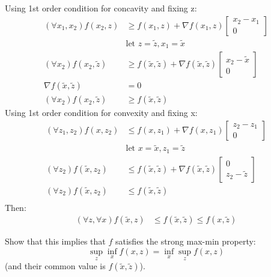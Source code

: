 \documentclass[12pt,letter]{article}
\begin{document}
\begin{enumerate}
\begin{enumerate}
    Using 1st order condition for concavity and fixing z:
    \begin{align*}
      (\forall x_1, x_2) f(x_2,z) & \geq f(x_1,z) + \nabla f(x_1,z)\begin{bmatrix} x_2-x_1\\0\end{bmatrix}\\
                                  &\text{let } z=\tilde{z}, x_1 = \tilde{x}\\
      (\forall x_2) f(x_2,\tilde{z}) & \geq f(\tilde{x},\tilde{z}) + \nabla f(\tilde{x},\tilde{z})\begin{bmatrix} x_2-\tilde{x}\\0\end{bmatrix}\\
      \nabla f(\tilde{x},\tilde{z}) &= 0\\
      (\forall x_2) f(x_2,\tilde{z}) & \geq f(\tilde{x},\tilde{z})
    \end{align*}
    Using 1st order condition for convexity and fixing x:
    \begin{align*}
      (\forall z_1, z_2) f(x,z_2) & \leq f(x,z_1) + \nabla f(x,z_1)\begin{bmatrix} z_2-z_1\\0\end{bmatrix}\\
                                  &\text{let } x=\tilde{x}, z_1 = \tilde{z}\\
      (\forall z_2) f(\tilde{x},z_2) & \leq f(\tilde{x},\tilde{z}) + \nabla f(\tilde{x},\tilde{z})\begin{bmatrix} 0\\z_2-\tilde{z}\end{bmatrix}\\
      (\forall z_2) f(\tilde{x},z_2) & \leq f(\tilde{x},\tilde{z})\\
    \end{align*}
    Then:
    \begin{align*}
      (\forall z, \forall x) f(\tilde{x},z) & \leq f(\tilde{x},\tilde{z}) \leq f(x,\tilde{z})
    \end{align*}
    
    \pagebreak
    
    Show that this implies that $f$ satisfies the strong max-min property: \[\sup_z \inf_x f(x, z) = \inf_x \sup_z f(x, z)\] (and their common value is $f(\tilde{x}, \tilde{z})$).


\end{enumerate}
\end{enumerate}
\end{document}
